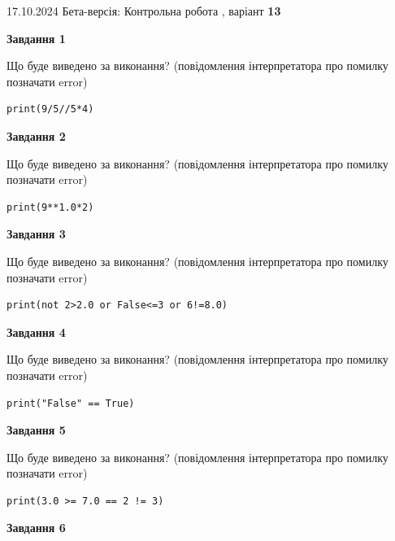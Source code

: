 \documentclass[12pt, ukrainian]{article}
\begin{document}
{\Large{17.10.2024 Бета-версія: Контрольна робота , варіант  \No \textbf { 13 }\par}}
{
\begin {large}
{\begin {center}\textbf{Завдання 1}\end {center}}

Що буде виведено за виконання? (повідомлення інтерпретатора про помилку позначати error)\par
\begin{verbatim}
print(9/5//5*4)
\end{verbatim}

{\begin {center}\textbf{Завдання 2}\end {center}}

Що буде виведено за виконання? (повідомлення інтерпретатора про помилку позначати error)\par
\begin{verbatim}
print(9**1.0*2)
\end{verbatim}

{\begin {center}\textbf{Завдання 3}\end {center}}

Що буде виведено за виконання? (повідомлення інтерпретатора про помилку позначати error)\par
\begin{verbatim}
print(not 2>2.0 or False<=3 or 6!=8.0)
\end{verbatim}

{\begin {center}\textbf{Завдання 4}\end {center}}

Що буде виведено за виконання? (повідомлення інтерпретатора про помилку позначати error)\par
\begin{verbatim}
print("False" == True)
\end{verbatim}

{\begin {center}\textbf{Завдання 5}\end {center}}

Що буде виведено за виконання? (повідомлення інтерпретатора про помилку позначати error)\par
\begin{verbatim}
print(3.0 >= 7.0 == 2 != 3)
\end{verbatim}

{\begin {center}\textbf{Завдання 6}\end {center}}


\end{large}}
\end{document}
